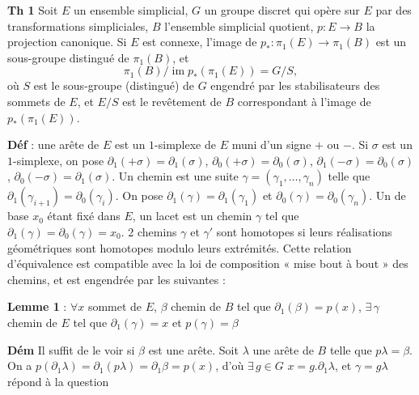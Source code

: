 \documentclass[11pt,a4paper]{article}
\begin{document}
\textbf{Th 1} Soit $E$ un ensemble simplicial, $G$ un groupe discret qui
opère sur $E$  par des transformations simpliciales, $B$
 l'ensemble simplicial quotient, \struck{\ill{}} $p : E \to
B$ la projection canonique. Si $E$ est connexe, l'image de $p_{*} : \pi_1(E)
\to \pi_1(B)$ est un sous-groupe distingué de $\pi_1(B)$, et
\[
\pi_1(B) / \operatorname{im} p_{*}(\pi_1(E)) = G/S,
\]
où $S$ est le sous-groupe (distingué) de $G$ engendré par les
stabilisateurs des sommets de $E$, et $E/S$ est le revêtement
\struck{\ill{}} de $B$ correspondant à l'image de $p_{*}(\pi_1(E))$.

\textbf{Déf} : une arête de $E$ est un $1$-simplexe de $E$ muni d'un signe
$+$ ou $-$. Si $\sigma$ est un $1$-simplexe, on pose $\partial_1(+\sigma)
= \partial_1(\sigma)$, $\partial_0(+\sigma) = \partial_0(\sigma)$,
$\partial_1(-\sigma) = \partial_0(\sigma)$, $\partial_0(-\sigma) =
\partial_1(\sigma)$. Un chemin est une suite  $\gamma =
(\gamma_1, \dots, \gamma_n)$ telle que $\partial_1(\gamma_{i+1}) =
\partial_0(\gamma_i)$. On pose $\partial_1(\gamma) = \partial_1(\gamma_1)$
et $\partial_0(\gamma) = \partial_0(\gamma_n)$. Un 
 de base $x_0$ étant fixé dans $E$, un lacet est un chemin
$\gamma$ tel que $\partial_1(\gamma) = \partial_0(\gamma) = x_0$. 2 chemins
$\gamma$ et $\gamma'$ sont homotopes si leurs réalisations géométriques
sont homotopes modulo leurs extrémités. Cette relation d'équivalence est
compatible avec la loi de composition « mise bout à bout » des chemins, et
est engendrée par les suivantes :


\textbf{Lemme 1} : $\forall x$ sommet de $E$, $\beta$ chemin de $B$ tel que
$\partial_1(\beta) = p(x)$, $\exists\, \gamma$ chemin de $E$ tel que
$\partial_1(\gamma) = x$ et $p(\gamma) = \beta$

\textbf{Dém} Il suffit de le voir si $\beta$ est une arête. Soit $\lambda$
une arête de $B$ telle que $p\lambda = \beta$. On a \struck{\ill{}}
$p(\partial_1 \lambda) = \partial_1(p\lambda) = \partial_1 \beta = p(x)$,
d'où $\exists\, g \in G$ \struck{\ill{}} $x = g.\partial_1 \lambda$, et
$\gamma = g\lambda$ répond à la question
\end{document}
